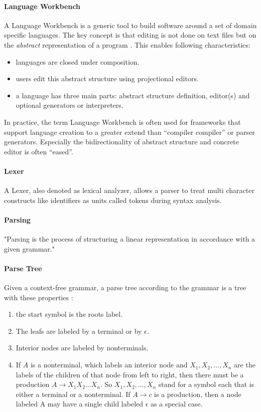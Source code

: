 \paragraph{Language Workbench}
A Language Workbench is a generic tool to build software around a set of domain specific languages. The key concept is that editing is not done on text files but on the \emph{abstract} representation of a program \cite{Fowler}. This enables following characteristics:
\begin{itemize}
	\item languages are closed under composition.
	\item users edit this abstract structure using projectional editors.
	\item a language has three main parts: abstract structure definition, editor(s) and optional generators or interpreters.
\end{itemize}
In practice, the term Language Workbench is often used for frameworks that support language creation to a greater extend than ``compiler compiler'' or parser generators. Especially the bidirectionality of abstract structure and concrete editor is often ``eased''. 

\paragraph{Lexer}
A Lexer, also denoted as lexical analyzer, allows a parser to treat multi character constructs like identifiers as units called tokens during syntax analysis. \cite{DragonBook}

\paragraph{Parsing} 
"Parsing is the process of structuring a linear representation in accordance with a given grammar." \cite{ParserBook}

\paragraph{Parse Tree}
Given a context-free grammar, a parse tree according to the grammar is a tree with these properties \cite{DragonBook}:
\begin{enumerate}
	\item the start symbol is the roots label.
	\item The leafs are labeled by a terminal or by $\epsilon$.
	\item Interior nodes are labeled by nonterminals.
	\item If $A$ is a nonterminal, which labels an interior node and $X_1, X_2, . . . , X_n$ are the labels of the children of that node from left to right, then there must be a production $A  \rightarrow X_1X_2 ... X_n$. So $X_1, X_2, ... , X_n$ stand for a symbol each that is either a terminal or a nonterminal. If $A\rightarrow c$ is a production, then a node labeled A may have a single child labeled $\epsilon$ as a special case. 
\end{enumerate}

